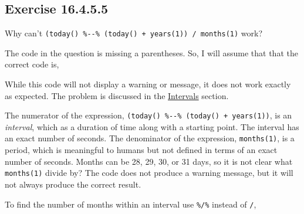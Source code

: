 \documentclass[]{book}
\newenvironment{Shaded}{\begin{snugshade}}{\end{snugshade}}
\newcommand{\CommentTok}[1]{\textcolor[rgb]{0.56,0.35,0.01}{\textit{#1}}}
\newcommand{\DecValTok}[1]{\textcolor[rgb]{0.00,0.00,0.81}{#1}}
\newcommand{\KeywordTok}[1]{\textcolor[rgb]{0.13,0.29,0.53}{\textbf{#1}}}
\newcommand{\NormalTok}[1]{#1}
\newcommand{\OperatorTok}[1]{\textcolor[rgb]{0.81,0.36,0.00}{\textbf{#1}}}
\newcommand{\StringTok}[1]{\textcolor[rgb]{0.31,0.60,0.02}{#1}}
\theoremstyle{plain}
\theoremstyle{remark}
\begin{document}
\hypertarget{exercise-16.4.5.5}{%
\subsection*{\texorpdfstring{Exercise {16.4.5.5}}{Exercise 16.4.5.5}}\label{exercise-16.4.5.5}}

Why can't \texttt{(today()\ \%-\/-\%\ (today()\ +\ years(1))\ /\ months(1)} work?

The code in the question is missing a parentheses.
So, I will assume that that the correct code is,

\begin{Shaded}
\end{Shaded}

While this code will not display a warning or message, it does not work exactly as
expected. The problem is discussed in the \href{https://r4ds.had.co.nz/dates-and-times.html\#intervals}{Intervals} section.

The numerator of the expression, \texttt{(today()\ \%-\/-\%\ (today()\ +\ years(1))}, is an \emph{interval}, which
as a duration of time along with a starting point. The interval has an exact number of
seconds.
The denominator of the expression, \texttt{months(1)}, is a period, which is meaningful to humans but not defined in terms of an exact number of seconds.
Months can be 28, 29, 30, or 31 days, so it is not clear what \texttt{months(1)} divide by?
The code does not produce a warning message, but it will not always produce the correct result.

To find the number of months within an interval use \texttt{\%/\%} instead of \texttt{/},

\begin{Shaded}
\end{Shaded}
\end{document}
